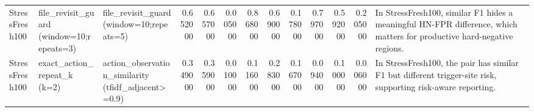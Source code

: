 \begin{table}
\begin{tabular}{lllrrrrrrrrrl}
StressFresh100 & file\_revisit\_guard (window=10;repeats=3) & file\_revisit\_guard (window=10;repeats=5) & 0.652000 & 0.657000 & 0.005000 & 0.868000 & 0.690000 & 0.178000 & 0.797000 & 0.592000 & 0.205000 & In StressFresh100, similar F1 hides a meaningful HN-FPR difference, which matters for productive hard-negative regions. \\
StressFresh100 & exact\_action\_repeat\_k (k=2) & action\_observation\_similarity (tfidf\_adjacent>=0.9) & 0.349000 & 0.359000 & 0.010000 & 0.116000 & 0.283000 & 0.167000 & 0.094000 & 0.100000 & 0.006000 & In StressFresh100, the pair has similar F1 but different trigger-site risk, supporting risk-aware reporting. \\
\bottomrule
\end{tabular}
\end{table}
